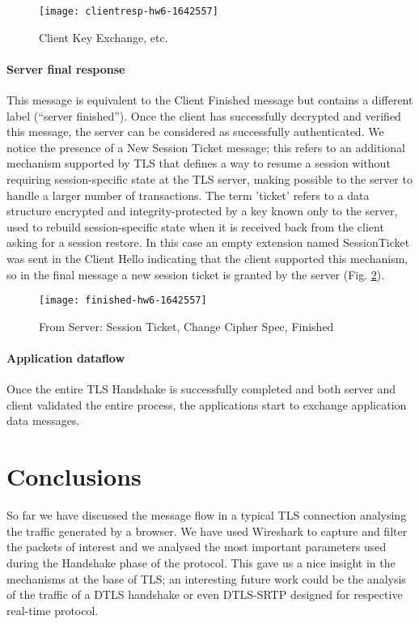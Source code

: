 \documentclass[11pt]{article}
\begin{document}
\begin{figure}[h]
\texttt{[image: clientresp-hw6-1642557]}
\centering
\caption{Client Key Exchange, etc.}
\label{fig:clientresp}
\end{figure}

\paragraph*{Server final response}
This message is equivalent to the Client Finished message but contains a different label (“server finished”). Once the client has successfully decrypted and verified this message, the server can be considered as successfully authenticated. We notice the presence of a New Session Ticket message; this refers to an additional mechanism supported by TLS that defines a way to resume a session without requiring session-specific state at the TLS server, making possible to the server to handle a larger number of transactions. The term 'ticket' \cite{RFC5077} refers to a data structure encrypted and integrity-protected by a key known only to the server, used to rebuild session-specific state when it is received back from the client asking for a session restore. In this case an empty extension named SessionTicket was sent in the Client Hello indicating that the client supported this mechanism, so in the final message a new session ticket is granted by the server (Fig. \ref{fig:finished}).

\begin{figure}[h]
\texttt{[image: finished-hw6-1642557]}
\centering
\caption{From Server: Session Ticket, Change Cipher Spec, Finished}
\label{fig:finished}
\end{figure}

\paragraph*{Application dataflow}
Once the entire TLS Handshake is successfully completed and both server and client validated the entire process, the applications start to exchange application data messages.

\section{Conclusions}
So far we have discussed the message flow in a typical TLS connection analysing the traffic generated by a browser. We have used Wireshark to capture and filter the packets of interest and we analysed the most important parameters used during the Handshake phase of the protocol. This gave us a nice insight in the mechanisms at the base of TLS; an interesting future work could be the analysis of the traffic of a DTLS handshake or even DTLS-SRTP designed for respective real-time protocol.

\clearpage
\nocite{*} %
 

\end{document}
